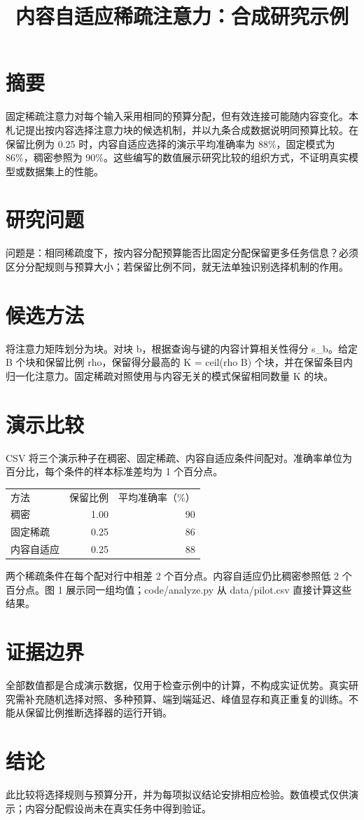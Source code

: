 \documentclass[UTF8]{ctexart}
\title{内容自适应稀疏注意力：合成研究示例}
\author{}
\date{}
\begin{document}
\maketitle

\section*{摘要}

固定稀疏注意力对每个输入采用相同的预算分配，但有效连接可能随内容变化。本札记提出按内容选择注意力块的候选机制，并以九条合成数据说明同预算比较。在保留比例为 0.25 时，内容自适应选择的演示平均准确率为 88\%，固定模式为 86\%，稠密参照为 90\%。这些编写的数值展示研究比较的组织方式，不证明真实模型或数据集上的性能。

\section*{研究问题}

问题是：相同稀疏度下，按内容分配预算能否比固定分配保留更多任务信息？必须区分分配规则与预算大小；若保留比例不同，就无法单独识别选择机制的作用。

\section*{候选方法}

将注意力矩阵划分为块。对块 b，根据查询与键的内容计算相关性得分 s\_b。给定 B 个块和保留比例 rho，保留得分最高的 K = ceil(rho B) 个块，并在保留条目内归一化注意力。固定稀疏对照使用与内容无关的模式保留相同数量 K 的块。

\section*{演示比较}

CSV 将三个演示种子在稠密、固定稀疏、内容自适应条件间配对。准确率单位为百分比，每个条件的样本标准差均为 1 个百分点。

\begin{center}\begin{tabular}{lrr}\hline
方法 & 保留比例 & 平均准确率（\%） \\
稠密 & 1.00 & 90 \\
固定稀疏 & 0.25 & 86 \\
内容自适应 & 0.25 & 88 \\
\hline\end{tabular}\end{center}

两个稀疏条件在每个配对行中相差 2 个百分点。内容自适应仍比稠密参照低 2 个百分点。图 1 展示同一组均值；code/analyze.py 从 data/pilot.csv 直接计算这些结果。

\section*{证据边界}

全部数值都是合成演示数据，仅用于检查示例中的计算，不构成实证优势。真实研究需补充随机选择对照、多种预算、端到端延迟、峰值显存和真正重复的训练。不能从保留比例推断选择器的运行开销。

\section*{结论}

此比较将选择规则与预算分开，并为每项拟议结论安排相应检验。数值模式仅供演示；内容分配假设尚未在真实任务中得到验证。
\end{document}
